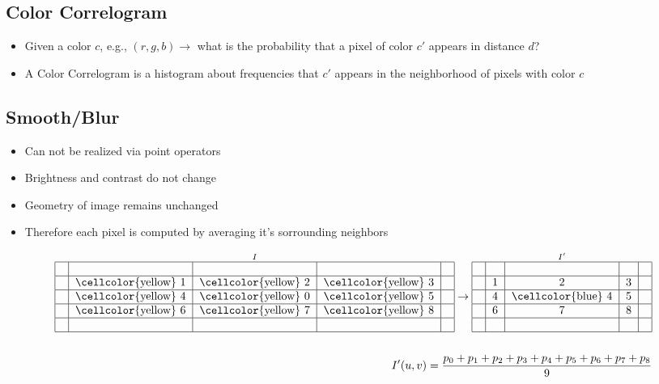 \documentclass{scrartcl}
\begin{document}
\subsection{Color Correlogram}

\begin{itemize}
	\item Given a color $ c $, e.g., $ (r,g,b) \rightarrow $ what is the probability that a pixel of color $ c' $ appears in distance $ d $?
	\item A Color Correlogram is a histogram about frequencies that $ c' $ appears in the neighborhood of pixels with color $ c $
\end{itemize}

\subsection{Smooth/Blur}

\begin{itemize}
	\item Can not be realized via point operators
	\item Brightness and contrast do not change
	\item Geometry of image remains unchanged
	\item Therefore each pixel is computed by averaging it's sorrounding neighbors
\end{itemize}

\begin{align*}
	\overset{I}{\begin{tabular}{|c|c|c|c|c|}
		\hline 
		&  &  &  &  \\ 
		\hline 
		& \cellcolor{yellow} 1 & \cellcolor{yellow} 2 & \cellcolor{yellow} 3 &  \\ 
		\hline 
		& \cellcolor{yellow} 4 & \cellcolor{yellow} 0 & \cellcolor{yellow} 5 &  \\ 
		\hline 
		& \cellcolor{yellow} 6 & \cellcolor{yellow} 7 & \cellcolor{yellow} 8 &  \\ 
		\hline 
		&  &  &  &  \\ 
		\hline
		\end{tabular}}
	\rightarrow
	\overset{I'}{\begin{tabular}{|c|c|c|c|c|}
		\hline 
		&  &  &  &  \\ 
		\hline 
		& 1 & 2 & 3 &  \\ 
		\hline 
		& 4 & \cellcolor{blue} 4 & 5 &  \\ 
		\hline 
		& 6 & 7 & 8 &  \\ 
		\hline 
		&  &  &  &  \\ 
		\hline
		\end{tabular}} \\
	\\
	I'(u,v)=\frac{p_0+p_1+p_2+p_3+p_4+p_5+p_6+p_7+p_8}{9}
\end{align*}
\end{document}
